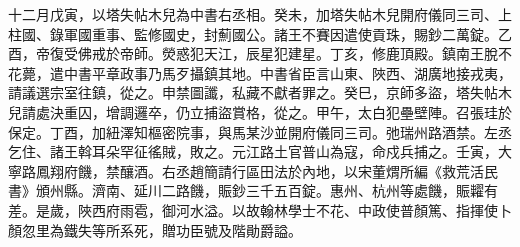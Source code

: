 \begin{pinyinscope}
 十二月戊寅，以塔失帖木兒為中書右丞相。癸未，加塔失帖木兒開府儀同三司、上柱國、錄軍國重事、監修國史，封薊國公。諸王不賽因遣使貢珠，賜鈔二萬錠。乙酉，帝復受佛戒於帝師。熒惑犯天江，辰星犯建星。丁亥，修鹿頂殿。鎮南王脫不花薨，遣中書平章政事乃馬歹攝鎮其地。中書省臣言山東、陜西、湖廣地接戎夷，請議選宗室往鎮，從之。申禁圖讖，私藏不獻者罪之。癸巳，京師多盜，塔失帖木兒請處決重囚，增調邏卒，仍立捕盜賞格，從之。甲午，太白犯壘壁陣。召張珪於保定。丁酉，加紐澤知樞密院事，與馬某沙並開府儀同三司。弛瑞州路酒禁。左丞乞住、諸王斡耳朵罕征徭賊，敗之。元江路土官普山為寇，命戍兵捕之。壬寅，大寧路鳳翔府饑，禁釀酒。右丞趙簡請行區田法於內地，以宋董煟所編《救荒活民書》頒州縣。濟南、延川二路饑，賑鈔三千五百錠。惠州、杭州等處饑，賑糶有差。是歲，陜西府雨雹，御河水溢。以故翰林學士不花、中政使普顏篤、指揮使卜顏忽里為鐵失等所系死，贈功臣號及階勛爵謚。



\end{pinyinscope}